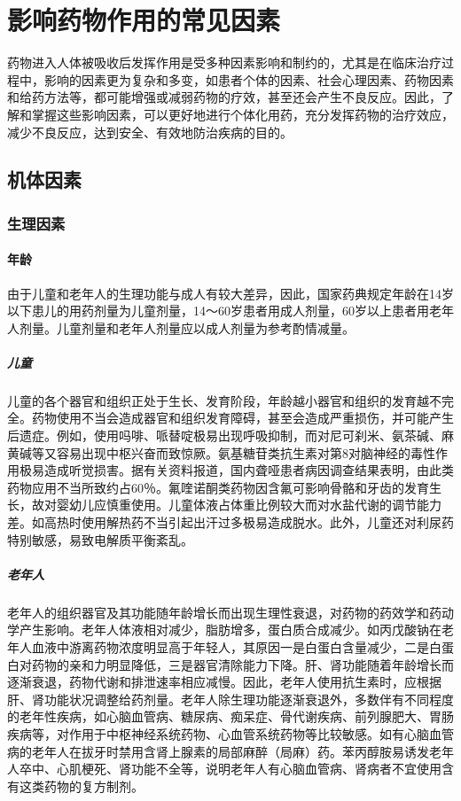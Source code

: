 \chapter{影响药物作用的常见因素}

药物进入人体被吸收后发挥作用是受多种因素影响和制约的，尤其是在临床治疗过程中，影响的因素更为复杂和多变，如患者个体的因素、社会心理因素、药物因素和给药方法等，都可能增强或减弱药物的疗效，甚至还会产生不良反应。因此，了解和掌握这些影响因素，可以更好地进行个体化用药，充分发挥药物的治疗效应，减少不良反应，达到安全、有效地防治疾病的目的。

\section{机体因素}

\subsection{生理因素}

\subsubsection{年龄}

由于儿童和老年人的生理功能与成人有较大差异，因此，国家药典规定年龄在14岁以下患儿的用药剂量为儿童剂量，14～60岁患者用成人剂量，60岁以上患者用老年人剂量。儿童剂量和老年人剂量应以成人剂量为参考酌情减量。
\paragraph{儿童}

儿童的各个器官和组织正处于生长、发育阶段，年龄越小器官和组织的发育越不完全。药物使用不当会造成器官和组织发育障碍，甚至会造成严重损伤，并可能产生后遗症。例如，使用吗啡、哌替啶极易出现呼吸抑制，而对尼可刹米、氨茶碱、麻黄碱等又容易出现中枢兴奋而致惊厥。氨基糖苷类抗生素对第8对脑神经的毒性作用极易造成听觉损害。据有关资料报道，国内聋哑患者病因调查结果表明，由此类药物应用不当所致约占60％。氟喹诺酮类药物因含氟可影响骨骼和牙齿的发育生长，故对婴幼儿应慎重使用。儿童体液占体重比例较大而对水盐代谢的调节能力差。如高热时使用解热药不当引起出汗过多极易造成脱水。此外，儿童还对利尿药特别敏感，易致电解质平衡紊乱。
\paragraph{老年人}

老年人的组织器官及其功能随年龄增长而出现生理性衰退，对药物的药效学和药动学产生影响。老年人体液相对减少，脂肪增多，蛋白质合成减少。如丙戊酸钠在老年人血液中游离药物浓度明显高于年轻人，其原因一是白蛋白含量减少，二是白蛋白对药物的亲和力明显降低，三是器官清除能力下降。肝、肾功能随着年龄增长而逐渐衰退，药物代谢和排泄速率相应减慢。因此，老年人使用抗生素时，应根据肝、肾功能状况调整给药剂量。老年人除生理功能逐渐衰退外，多数伴有不同程度的老年性疾病，如心脑血管病、糖尿病、痴呆症、骨代谢疾病、前列腺肥大、胃肠疾病等，对作用于中枢神经系统药物、心血管系统药物等比较敏感。如有心脑血管病的老年人在拔牙时禁用含肾上腺素的局部麻醉（局麻）药。苯丙醇胺易诱发老年人卒中、心肌梗死、肾功能不全等，说明老年人有心脑血管病、肾病者不宜使用含有这类药物的复方制剂。


